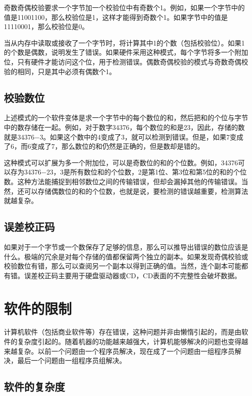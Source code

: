 奇数奇偶校验要求一个字节加一个校验位中有奇数个1。例如，如果一个字节中的值是11001100，那么校验位是1，这样才能得到奇数个1。如果字节中的值是11110001，那么校验位是0。

当从内存中读取或接收了一个字节时，将计算其中1的个数（包括校验位）。如果1的个数是偶数，说明发生了错误。如果硬件采用这种模式，每个字节将多一个附加位，只有硬件才能访问这个位，用于检测错误。偶数奇偶校验的模式与奇数奇偶校验的相同，只是其中必须有偶数个1。

\section{校验数位}

上述模式的一个软件变体是求一个字节中的每个数位的和，然后把和的个位与字节中的数存储在一起。例如，对于数字34376，每个数位的和是23，因此，存储的数就是34376$-$3。如果这个数中的4变成了3，就可以检测到错误。但是，如果7变成了6，而6变成了7，那么数位的和仍然是正确的，但是数却是错的。

这种模式可以扩展为多一个附加位，可以是奇数位的和的个位数。例如，34376可以存为34376$-$23，3是所有数位和的个位数，2是第1位、第3位和第5位的和的个位数。这种方法能捕捉到相邻数位之间的传输错误，但却会漏掉其他的传输错误。当然，还可以存储偶数位的和的个位数，也就是说，要检测的错误越重要，检测算法就越复杂。


\section{误差校正码}

如果对于一个字节或一个数保存了足够的信息，那么可以推导出错误的数位应该是什么。极端的冗余是对每个存储的值都保留两个独立的副本。如果发现奇偶校验或校验数位有错，那么可以查阅另一个副本以得到正确的值。当然，连个副本可能都有错。误差校正码主要用于硬盘驱动器或CD，CD表面的不完整性会破坏数据。

\chapter{软件的限制}

计算机软件（包括商业软件等）存在错误，这种问题并非由懒惰引起的，而是由软件的复杂度引起的。随着机器的功能越来越强大，计算机能够解决的问题也变得越来越复杂。以前一个问题由一个程序员解决，现在成了一个问题由一组程序员解决，最后一个问题由一组程序员组解决。

\section{软件的复杂度}

